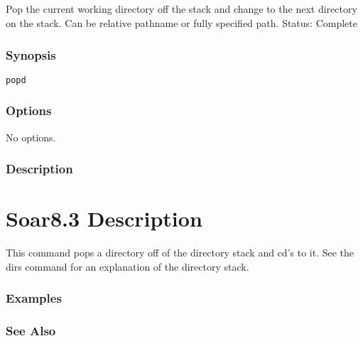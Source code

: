 \subsection{}
\label{popd}
Pop the current working directory off the stack and change to the next directory on the stack. Can be relative pathname or fully specified path. 
 Status: Complete
\subsubsection*{Synopsis}
\begin{verbatim}
popd
\end{verbatim}
\subsubsection*{Options}
 No options. 
\subsubsection*{Description}
\section*{ Soar8.3 Description }
 This command pops a directory off of the directory stack and cd's to it. See the dirs command for an explanation of the directory stack. 
\subsubsection*{Examples}
\subsubsection*{See Also}
